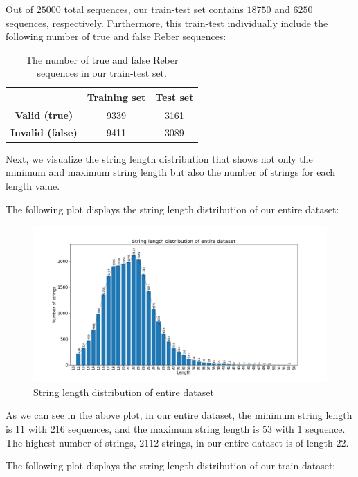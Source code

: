 Out of $25000$ total sequences, our train-test set contains $18750$ and $6250$ sequences, respectively. Furthermore, this train-test individually include the following number of true and false Reber sequences:

\begin{table}[h]
	\centering
	\begin{tabular}{|c|c|c|}
	    \hline
		 & \textbf{Training set} & \textbf{Test set} \\
		\hline
		\textbf{Valid (true)} & 9339 & 3161 \\
		\textbf{Invalid (false)} & 9411 & 3089 \\
		\hline
	\end{tabular}
	\caption[The number of true and false Reber sequences in our train-test set]{The number of true and false Reber sequences in our train-test set.}
	\label{tab:train-test_strings}
\end{table}
Next, we visualize the string length distribution that shows not only the minimum and maximum string length but also the number of strings for each length value.

The following plot displays the string length distribution of our entire dataset:

\begin{figure}[h]
    \centering
    \includegraphics[width=0.9\linewidth]{images/dataset/entire_dataset_string_len.png}
    \caption[String length distribution of entire dataset]{String length distribution of entire dataset}
    \label{fig:string_len}
\end{figure}

As we can see in the above plot, in our entire dataset, the minimum string length is $11$ with $216$ sequences, and the maximum string length is $53$ with $1$ sequence. The highest number of strings, $2112$ strings, in our entire dataset is of length $22$.

The following plot displays the string length distribution of our train dataset:

